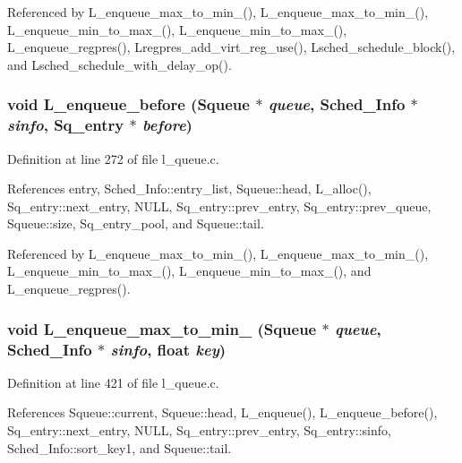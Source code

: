 Referenced by L\_\-enqueue\_\-max\_\-to\_\-min\_(), L\_\-enqueue\_\-max\_\-to\_\-min\_(), L\_\-enqueue\_\-min\_\-to\_\-max\_(), L\_\-enqueue\_\-min\_\-to\_\-max\_(), L\_\-enqueue\_\-regpres(), Lregpres\_\-add\_\-virt\_\-reg\_\-use(), Lsched\_\-schedule\_\-block(), and Lsched\_\-schedule\_\-with\_\-delay\_\-op().
\subsubsection{\setlength{\rightskip}{0pt plus 5cm}void L\_\-enqueue\_\-before (\bf{Squeue} $\ast$ {\em queue}, \bf{Sched\_\-Info} $\ast$ {\em sinfo}, \bf{Sq\_\-entry} $\ast$ {\em before})}\label{l__queue_8c_46675dc20c89b99f8127ea049d63661b}




Definition at line 272 of file l\_\-queue.c.

References entry, Sched\_\-Info::entry\_\-list, Squeue::head, L\_\-alloc(), Sq\_\-entry::next\_\-entry, NULL, Sq\_\-entry::prev\_\-entry, Sq\_\-entry::prev\_\-queue, Squeue::size, Sq\_\-entry\_\-pool, and Squeue::tail.

Referenced by L\_\-enqueue\_\-max\_\-to\_\-min\_(), L\_\-enqueue\_\-max\_\-to\_\-min\_(), L\_\-enqueue\_\-min\_\-to\_\-max\_(), L\_\-enqueue\_\-min\_\-to\_\-max\_(), and L\_\-enqueue\_\-regpres().
\subsubsection{\setlength{\rightskip}{0pt plus 5cm}void L\_\-enqueue\_\-max\_\-to\_\-min\_ (\bf{Squeue} $\ast$ {\em queue}, \bf{Sched\_\-Info} $\ast$ {\em sinfo}, float {\em key})}\label{l__queue_8c_03c5b423bc932779e1a8baf558f7df36}




Definition at line 421 of file l\_\-queue.c.

References Squeue::current, Squeue::head, L\_\-enqueue(), L\_\-enqueue\_\-before(), Sq\_\-entry::next\_\-entry, NULL, Sq\_\-entry::prev\_\-entry, Sq\_\-entry::sinfo, Sched\_\-Info::sort\_\-key1, and Squeue::tail.
